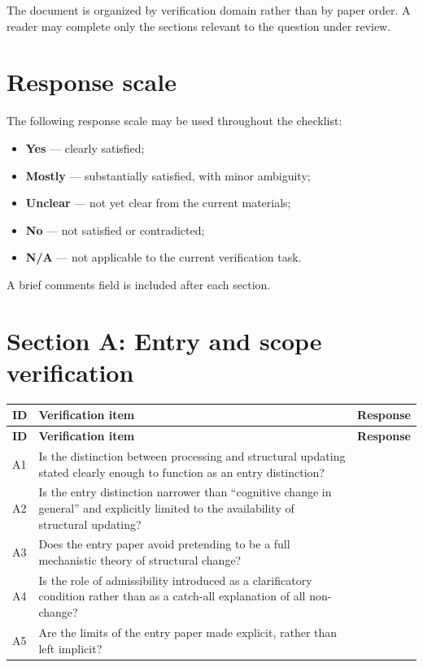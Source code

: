 \documentclass[11pt,a4paper]{article}
\begin{document}
	The document is organized by verification domain rather than by paper order. A reader may
	complete only the sections relevant to the question under review.
	
	\section{Response scale}
	
	The following response scale may be used throughout the checklist:
	
	\begin{itemize}[leftmargin=2em]
		\item \textbf{Yes} --- clearly satisfied;
		\item \textbf{Mostly} --- substantially satisfied, with minor ambiguity;
		\item \textbf{Unclear} --- not yet clear from the current materials;
		\item \textbf{No} --- not satisfied or contradicted;
		\item \textbf{N/A} --- not applicable to the current verification task.
	\end{itemize}
	
	\vspace{0.5em}
	\noindent
	A brief comments field is included after each section.
	
	\section{Section A: Entry and scope verification}
	
	\begin{longtable}{>{\RaggedRight\arraybackslash}p{}
			>{\RaggedRight\arraybackslash}p{}
			>{\RaggedRight\arraybackslash}p{}}
		\toprule
		\textbf{ID} & \textbf{Verification item} & \textbf{Response} \\
		\midrule
		\endfirsthead
		\toprule
		\textbf{ID} & \textbf{Verification item} & \textbf{Response} \\
		\midrule
		\endhead
		
		A1 & Is the distinction between processing and structural updating stated clearly enough to function as an entry distinction? & \\
		
		A2 & Is the entry distinction narrower than ``cognitive change in general'' and explicitly limited to the availability of structural updating? & \\
		
		A3 & Does the entry paper avoid pretending to be a full mechanistic theory of structural change? & \\
		
		A4 & Is the role of admissibility introduced as a clarificatory condition rather than as a catch-all explanation of all non-change? & \\
		
		A5 & Are the limits of the entry paper made explicit, rather than left implicit? & \\
		
		\bottomrule
	\end{longtable}
	
\end{document}
